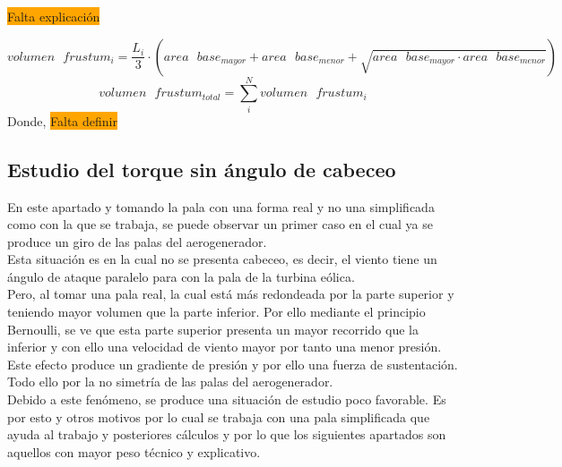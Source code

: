 \begin{definicion}

\colorbox{Orange}{ Falta explicación }

$$ volumen \text{ } frustum_i = \dfrac{L_i}{3} \cdot (area \text{ } base_{mayor} + area \text{ } base_{menor} + \sqrt{area \text{ } base_{mayor} \cdot area \text{ } base_{menor}}) $$ 
$$ volumen \text{ } frustum_{total} = \sum_{i}^{N}volumen \text{ } frustum_i  $$
Donde,
\centering \colorbox{Orange}{ Falta definir}
\label{def:volumen_tronco_frustum}
\end{definicion}



\subsection{Estudio del torque sin ángulo de cabeceo}
\label{section:torque_pala_horizontal}
En este apartado y tomando la pala con una forma real y no una simplificada como con la que se trabaja, se puede observar un primer caso en el cual ya se produce un giro de las palas del aerogenerador. \\

Esta situación es en la cual no se presenta cabeceo, es decir, el viento tiene un ángulo de ataque paralelo para con la pala de la turbina eólica. \\

Pero, al tomar una pala real, la cual está más redondeada por la parte superior y teniendo mayor volumen que la parte inferior. Por ello mediante el principio Bernoulli, se ve que esta parte superior presenta un mayor recorrido que la inferior y con ello una velocidad de viento mayor por tanto una menor presión. \\

Este efecto produce un gradiente de presión y por ello una fuerza de sustentación. Todo ello por la no simetría de las palas del aerogenerador. \\

Debido a este fenómeno, se produce una situación de estudio poco favorable. Es por esto y otros motivos por lo cual se trabaja con una pala simplificada que ayuda al trabajo y posteriores cálculos y por lo que los siguientes apartados son aquellos con mayor peso técnico y explicativo. \\

